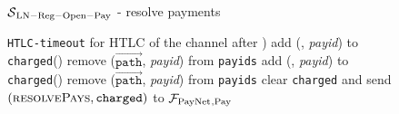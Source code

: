 \begin{figure}[H]
\begin{simulatorbox}{$\mathcal{S}{}_{\mathrm{LN - Reg - Open - Pay}}$ - resolve
  payments}
\begin{algorithmic}[1]
{              \texttt{HTLC-timeout} for HTLC of the channel after \alice{})}
                \State add (\alice, \textit{payid}) to \texttt{charged}(\alice)
                \State remove ($\overrightarrow{\mathtt{path}}$, \textit{payid})
                from \texttt{payids}
                \State add (\alice, \textit{payid}) to \texttt{charged}(\alice)
                \State remove ($\overrightarrow{\mathtt{path}}$, \textit{payid})
                from \texttt{payids}
              \EndIf
            \EndFor
          \EndFor
        \EndIf
        \State clear \texttt{charged} and send $\left(\textsc{resolvePays},
        \mathtt{charged}\right)$ to $\mathcal{F}_{\mathrm{PayNet}}{}_{\mathrm{, Pay}}$
      \EndIndent
    \end{algorithmic}
  \end{simulatorbox}
  \caption{}
  \label{alg:sim:resolvepay}
\end{figure}

